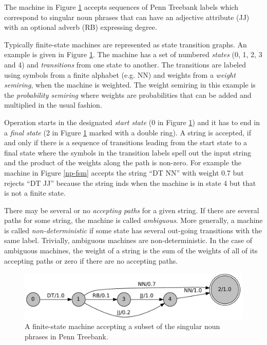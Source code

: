 The machine in Figure \ref{fig:np-fsm} accepts sequences of Penn
Treebank labels which correspond to singular noun phrases that can
have an adjective attribute (JJ) with an optional adverb (RB)
expressing degree.

Typically finite-state machines are represented as state transition
graphs. An example is given in Figure \ref{fig:np-fsm}. The machine
has a set of numbered {\it states} (0, 1, 2, 3 and 4) and {\it
  transitions} from one state to another. The transitions are labeled
using symbols from a finite alphabet (e.g. NN) and weights from a {\it
  weight semiring}, when the machine is weighted. The weight semiring
in this example is the {\it probability semiring} \cite{Allauzen2007}
where weights are probabilities that can be added and multiplied in
the usual fashion.

Operation starts in the designated {\it start state} (0 in Figure
\ref{fig:np-fsm}) and it has to end in a {\it final state} (2 in
Figure \ref{fig:np-fsm} marked with a double ring). A string is
accepted, if and only if there is a sequence of transitions leading
from the start state to a final state where the symbols in the
transition labels spell out the input string and the product of the
weights along the path is non-zero. For example the machine in Figure
\ref{np-fsm} accepts the string ``DT NN'' with weight 0.7 but rejects
``DT JJ'' because the string inds when the machine is in state 4 but
that is not a finite state.

There may be several or no {\it accepting paths} for a given
string. If there are several paths for some string, the machine is
called {\it ambiguous}. More generally, a machine is called {\it
  non-deterministic} if some state has several out-going transitions
with the same label. Trivially, ambiguous machines are
non-deterministic. In the case of ambiguous machines, the weight of a
string is the sum of the weights of all of its accepting paths or zero
if there are no accepting paths.

\begin{figure}
\begin{center}
\includegraphics[scale=.7]{np}
\end{center}
\caption{A finite-state machine accepting a subset of the singular noun phrases in Penn Treebank.}\label{fig:np-fsm}
\end{figure}

